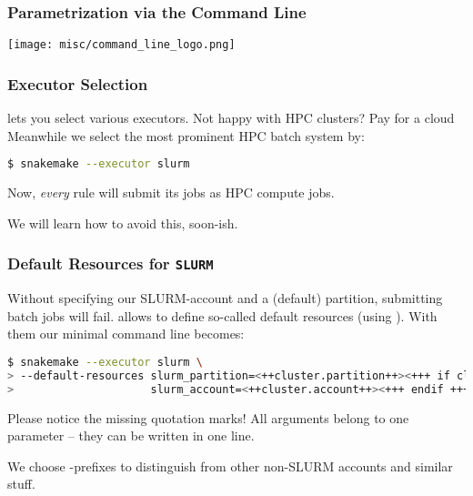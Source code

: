 \begin{frame}
  \frametitle{Parametrization via the Command Line}
  \centering
  \texttt{[image: misc/command\_line\_logo.png]}
\end{frame}

\begin{frame}[fragile]
  \frametitle{Executor Selection}
  \Snakemake{} lets you select various executors. Not happy with HPC clusters? Pay for a cloud  \newline
  Meanwhile we select the most prominent HPC batch system by:
  \begin{lstlisting}[language=Bash, style=Shell]
$ snakemake --executor slurm
  \end{lstlisting}
  Now, \emph{every} rule will submit its jobs as HPC compute jobs.
  \begin{hint}
  	We will learn how to avoid this, soon-ish.
  \end{hint}
\end{frame}

\begin{frame}[fragile]
  \frametitle{Default Resources for \texttt{SLURM}}
  Without specifying our SLURM-account and a (default) partition, submitting batch jobs will fail. \Snakemake{} allows to define so-called default resources (using ). With them our minimal command line becomes:
  \begin{lstlisting}[language=Bash, style=Shell, basicstyle=\footnotesize]
$ snakemake --executor slurm \
> --default-resources slurm_partition=<++cluster.partition++><+++ if cluster.account is defined +++> \
>                     slurm_account=<++cluster.account++><+++ endif +++>                      
  \end{lstlisting}
  \begin{hint}
  	Please notice the missing quotation marks! All arguments belong to one parameter -- they can be written in one line.
  \end{hint}
  \begin{docs}
  	We choose -prefixes to distinguish from other non-SLURM accounts and similar stuff.
  \end{docs}
\end{frame}

